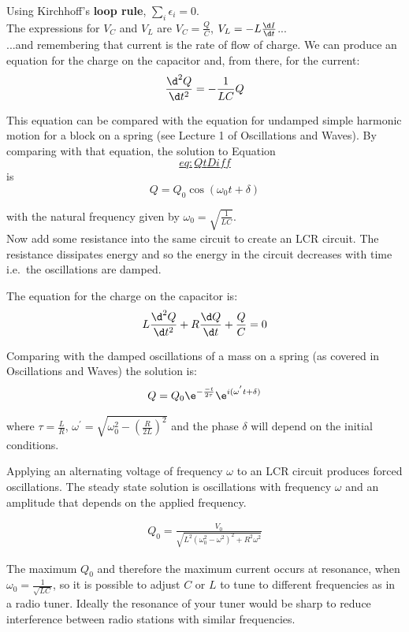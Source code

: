 \documentclass[
]{book}
\begin{document}
Using Kirchhoff's \textbf{loop rule}, \(\sum_i \epsilon_i = 0\).\\
The expressions for \(V_C\) and \(V_L\) are \(V_C = \frac{Q}{C}\),
\(V_L = -L \frac{\d I}{\d t}\)...\\
...and remembering that current is the rate of flow of charge. We can
produce an equation for the charge on the capacitor and, from there, for
the current: \[\frac{\d^2 Q}{\d t^2} = - \frac{1}{LC} Q
\label{eq:QtDiff}\]

This equation can be compared with the equation for undamped simple
harmonic motion for a block on a spring (see Lecture 1 of Oscillations
and Waves). By comparing with that equation, the solution to Equation
\protect\hyperlink{eq:QtDiff}{\[eq:QtDiff\]} is \[Q = Q_0 \cos⁡(\omega_0 t + \delta)\]

with the natural frequency given by \(\omega_0 = \sqrt{ \frac{1}{LC} }\).\\
Now add some resistance into the same circuit to create an LCR circuit.
The resistance dissipates energy and so the energy in the circuit
decreases with time i.e.~the oscillations are damped.

The equation for the charge on the capacitor is:
\[L \frac{ \d^2 Q}{\d t^2} + R \frac{\d Q}{\d t} + \frac{Q}{C} = 0\]

Comparing with the damped oscillations of a mass on a spring (as covered
in Oscillations and Waves) the solution is:
\[Q = Q_0 \e^{ - \frac{-t}{2\tau} } \e^{i(\omega^{'} t + \delta)}\]

where \(\tau = \frac{L}{R}\),
\(\omega^{'} = \sqrt{ \omega_0^2 - \left( \frac{R}{2 L} \right)^2}\) and
the phase \(\delta\) will depend on the initial conditions.

Applying an alternating voltage of frequency \(\omega\) to an LCR circuit
produces forced oscillations. The steady state solution is oscillations
with frequency \(\omega\) and an amplitude that depends on the applied
frequency.

\[\begin{aligned}
Q_0 = \frac{V_0}{\sqrt{ L^2 (\omega_0^2 - \omega^2)^2 + R^2 \omega^2 }}
\end{aligned}\]

The maximum \(Q_0\) and therefore the maximum current occurs at resonance,
when \(\omega_0 = \frac{1}{\sqrt{LC}}\), so it is possible to adjust \(C\)
or \(L\) to tune to different frequencies as in a radio tuner. Ideally the
resonance of your tuner would be sharp to reduce interference between
radio stations with similar frequencies.
\end{document}
